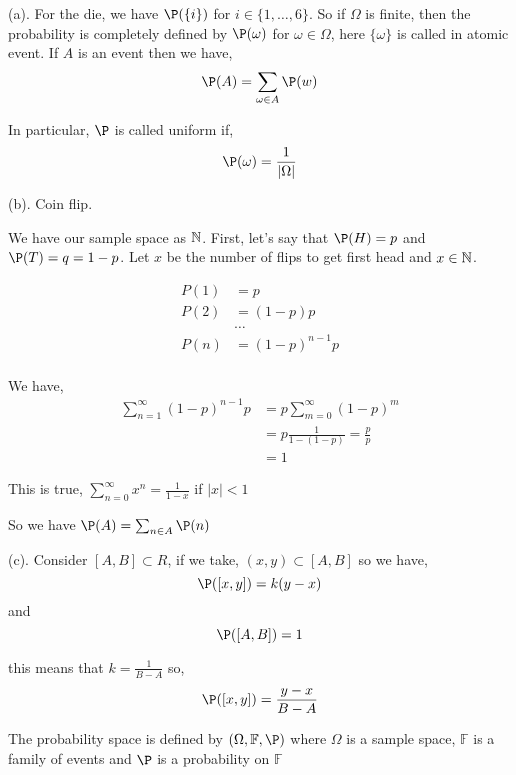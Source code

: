 \begin{eg}
    (a). For the die, we have $\P(\{i\})$ for  $i \in \{1,\dots, 6\}$. So if $\Omega$ is finite, then the probability is completely defined by $\P(\omega)$ for  $\omega \in \Omega$, here $\{\omega\}$ is called in atomic event. If $A$ is an event then we have, 
    $$ \P(A) = \sum_{\omega\in A} \P(w)$$ 


    In particular, $\P$ is called uniform if, 
    $$ \P(\omega) = \frac{1}{|\Omega|} $$ 

    (b). Coin flip. 

    We have our sample space as $\mathbb{N}$. First, let's say that $\P(H) = p$ and  $\P(T) = q = 1- p$. Let $x$ be the number of flips to get first head and $x \in \mathbb{N}$.

     \begin{align*}
         P(1) &= p \\
         P(2) &= (1 - p) p \\
              &\dots\\
         P(n) &= (1 - p)^{n - 1} p \\
     \end{align*}

     We have,
     \begin{align*}
         \sum_{n=1}^{\infty} (1 - p)^{n - 1} p &= p \sum_{m=0}^{\infty} (1 - p)^{m}\\
                                               &= p \frac{1}{1 - (1 - p)} = \frac{p}{p}\\
                                               &= 1
     \end{align*}
     \begin{note}
         This is true, $\sum_{n=0}^{\infty} x^{n} = \frac{1}{1 - x}$ if $|x| < 1$
     \end{note}


     So we have $\P(A) = \sum_{n \in A} \P(n)$


     (c). Consider $[A, B] \subset R$, if we take,  $(x, y) \subset [A, B]$ so we have,  
     $$ \P([x, y]) = k(y - x) $$ 
     and 
     $$ \P([A, B])  = 1$$ 

     this means that $k = \frac{1}{B - A}$  so, 
     $$ \P([x, y])= \frac{y - x}{B - A} $$ 




\end{eg}
\begin{definition}
     The probability space is defined by $(\Omega, \mathbb{F}, \P)$ where  $\Omega$ is a sample space,  $\mathbb{F}$ is a family of events and  $\P$ is a probability on  $\mathbb{F}$
 \end{definition}

